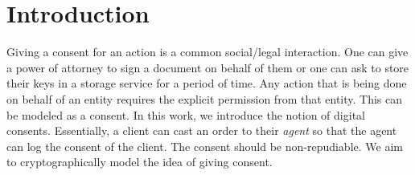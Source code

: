 \section{Introduction}

Giving a consent for an action is a common social/legal interaction. One can give a power of attorney to sign a document on behalf of them or one can ask to store their keys in a storage service for a period of time. Any action that is being done on behalf of an entity requires the explicit permission from that entity. This can be modeled as a consent. In this work, we introduce the notion of digital consents. Essentially, a client can cast an order to their \emph{agent} so that the agent can log the consent of the client. The consent should be non-repudiable. We aim to cryptographically model the idea of giving consent.

